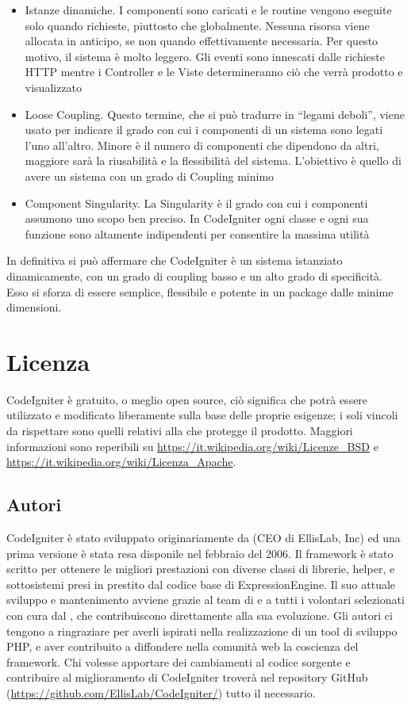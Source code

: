 \begin{itemize}
\item Istanze dinamiche. I componenti sono caricati e le routine vengono eseguite solo quando richieste, piuttosto che globalmente. Nessuna risorsa viene allocata in anticipo, se non quando effettivamente necessaria. Per questo motivo, il sistema è molto leggero. Gli eventi sono innescati dalle richieste \ac{HTTP} mentre i Controller e le Viste determineranno ciò che verrà prodotto e visualizzato
\item Loose Coupling. Questo termine, che si può tradurre in ``legami deboli'', viene usato per indicare il grado con cui i componenti di un sistema sono legati l'uno all'altro. Minore è il numero di componenti che dipendono da altri, maggiore sarà la riusabilità e la flessibilità del sistema. L'obiettivo è quello di avere un sistema con un grado di Coupling minimo
\item Component Singularity. La Singularity è il grado con cui i componenti assumono uno scopo ben preciso. In CodeIgniter ogni classe e ogni sua funzione sono altamente indipendenti per consentire la massima utilità
\end{itemize}

In definitiva si può affermare che CodeIgniter è un sistema istanziato dinamicamente, con un grado di coupling basso e un alto grado di specificità. Esso si sforza di essere semplice, flessibile e potente in un package dalle minime dimensioni.

\section*{Licenza}
CodeIgniter è gratuito, o meglio open source, ciò significa che potrà essere utilizzato e modificato liberamente sulla base delle proprie esigenze; i soli vincoli da rispettare sono quelli relativi alla  che protegge il prodotto. Maggiori informazioni sono reperibili su \url{https://it.wikipedia.org/wiki/Licenze_BSD} e \url{https://it.wikipedia.org/wiki/Licenza_Apache}.

\subsection*{Autori}
CodeIgniter è stato sviluppato originariamente da  (CEO di EllisLab, Inc) ed una prima versione è stata resa disponile nel febbraio del 2006. Il framework è stato scritto per ottenere le migliori prestazioni con diverse classi di librerie, helper, e sottosistemi presi in prestito dal codice base di ExpressionEngine. Il suo attuale sviluppo e mantenimento avviene grazie al team di  e a tutti i volontari selezionati con cura dal , che contribuiscono direttamente alla sua evoluzione. Gli autori ci tengono a ringraziare  per averli ispirati nella realizzazione di un tool di sviluppo \ac{PHP}, e aver contribuito a diffondere nella comunità web la coscienza del framework. Chi volesse apportare dei cambiamenti al codice sorgente e contribuire al miglioramento di CodeIgniter troverà nel repository GitHub (\url{https://github.com/EllisLab/CodeIgniter/}) tutto il necessario.

